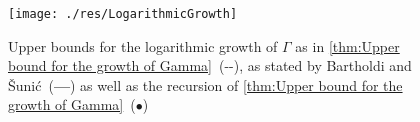\begin{figure}
\begin{centering}
\texttt{[image: ./res/LogarithmicGrowth]}
%
\caption{Upper bounds for the logarithmic growth of $\Gamma$ as in \cref{thm:Upper bound for the growth of Gamma}~\mbox{(-\hspace{2pt}-)}, as stated by Bartholdi and \v{S}uni\'{c}~(\textbf{---}) as well as the recursion of \cref{thm:Upper bound for the growth of Gamma}~($\bullet $)}
\label{g:Logarithmic growth}
\end{centering}
\end{figure}

